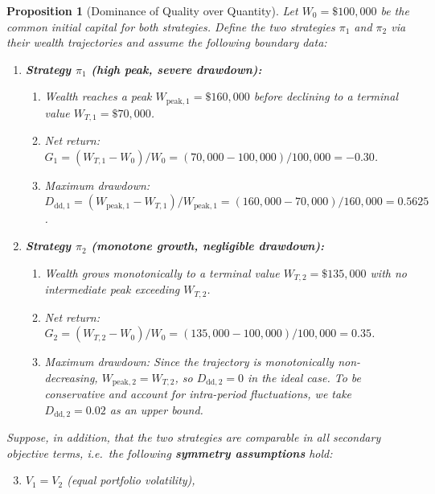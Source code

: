 \documentclass[12pt,openany]{book}
\numberwithin{equation}{chapter}
\theoremstyle{plain}
\newtheorem{proposition}[theorem]{Proposition}
\theoremstyle{definition}
\theoremstyle{remark}
\numberwithin{equation}{chapter}
\theoremstyle{plain}
\begin{document}
\begin{proposition}[Dominance of Quality over Quantity]
\label{prop:quality-dominance}
Let $W_0 = \$100{,}000$ be the common initial capital for both strategies.
Define the two strategies $\pi_1$ and $\pi_2$ via their wealth trajectories
and assume the following \emph{boundary data}:
\begin{enumerate}
  \item \textbf{Strategy $\pi_1$ (high peak, severe drawdown):}
        \begin{enumerate}
          \item Wealth reaches a peak $W_{\mathrm{peak},1} = \$160{,}000$
                before declining to a terminal value
                $W_{T,1} = \$70{,}000$.
          \item Net return:
                $G_1 = (W_{T,1} - W_0)/W_0
                     = (70{,}000 - 100{,}000)/100{,}000 = -0.30$.
          \item Maximum drawdown:
                $D_{\mathrm{dd},1}
                 = (W_{\mathrm{peak},1} - W_{T,1})/W_{\mathrm{peak},1}
                 = (160{,}000 - 70{,}000)/160{,}000 = 0.5625$.
        \end{enumerate}
  \item \textbf{Strategy $\pi_2$ (monotone growth, negligible drawdown):}
        \begin{enumerate}
          \item Wealth grows monotonically to a terminal value
                $W_{T,2} = \$135{,}000$ with no intermediate peak
                exceeding $W_{T,2}$.
          \item Net return:
                $G_2 = (W_{T,2} - W_0)/W_0
                     = (135{,}000 - 100{,}000)/100{,}000 = 0.35$.
          \item Maximum drawdown: Since the trajectory is monotonically
                non-decreasing, $W_{\mathrm{peak},2} = W_{T,2}$,
                so $D_{\mathrm{dd},2} = 0$ in the ideal case.  To be
                conservative and account for intra-period fluctuations,
                we take $D_{\mathrm{dd},2} = 0.02$ as an upper bound.
        \end{enumerate}
\end{enumerate}
Suppose, in addition, that the two strategies are \emph{comparable} in all
secondary objective terms, i.e.\ the following \textbf{symmetry assumptions}
hold:
\begin{enumerate}
  \setcounter{enumi}{2}
  \item $V_1 = V_2$ (equal portfolio volatility),

\end{enumerate}
\end{proposition}
\end{document}
